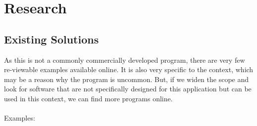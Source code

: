 \documentclass[11pt]{report}
\begin{document}
\newpage
\section{Research}
	\subsection{Existing Solutions}

		As this is not a commonly commercially developed program, there are very few re-viewable examples available online. It is also very specific to the context, which may be a reason why the program is uncommon. But, if we widen the scope and look for software that are not specifically designed for this application but can be used in this context, we can find more programs online. \\\\Examples:
\end{document}
